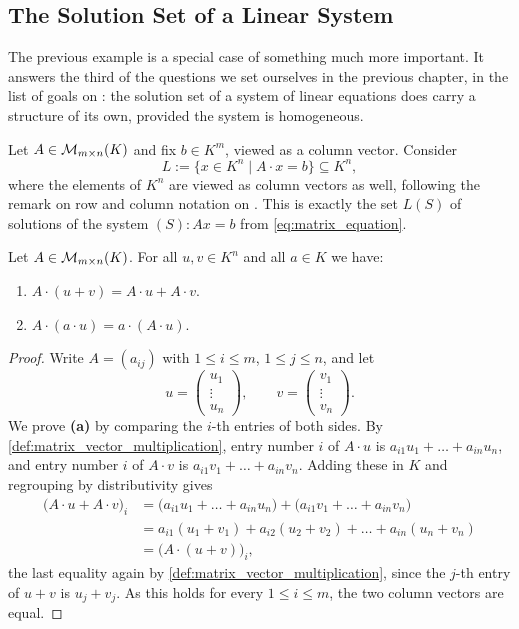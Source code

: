 \subsection{The Solution Set of a Linear System}

The previous example is a special case of something much more important. It answers the third of the questions we set ourselves in the previous chapter, in the list of goals on : the solution set of a system of linear equations does carry a structure of its own, provided the system is homogeneous.

Let $A \in \mathcal{M}_{m \times n}(K)$ and fix $b \in K^m$, viewed as a column vector. Consider
\[
L := \{x \in K^n \mid A \cdot x = b\} \subseteq K^n,
\]
where the elements of $K^n$ are viewed as column vectors as well, following the remark on row and column notation on . This is exactly the set $L(S)$ of solutions of the system $(S): Ax = b$ from \eqref{eq:matrix_equation}.

\begin{lemma}
\label{lem:matrix_vector_linearity}
Let $A \in \mathcal{M}_{m \times n}(K)$. For all $u, v \in K^n$ and all $a \in K$ we have:
\begin{enumerate}[label=\textbf{(\alph*)}]
    \item $A \cdot (u + v) = A \cdot u + A \cdot v$.
    \item $A \cdot (a \cdot u) = a \cdot (A \cdot u)$.
\end{enumerate}
\end{lemma}

\begin{proof}
Write $A = (a_{ij})$ with $1 \le i \le m$, $1 \le j \le n$, and let
\[
u = \begin{pmatrix} u_1 \\ \vdots \\ u_n \end{pmatrix}, \qquad
v = \begin{pmatrix} v_1 \\ \vdots \\ v_n \end{pmatrix}.
\]
We prove \textbf{(a)} by comparing the $i$-th entries of both sides. By \cref{def:matrix_vector_multiplication}, entry number $i$ of $A \cdot u$ is $a_{i1}u_1 + \dots + a_{in}u_n$, and entry number $i$ of $A \cdot v$ is $a_{i1}v_1 + \dots + a_{in}v_n$. Adding these in $K$ and regrouping by distributivity gives
\begin{align*}
\bigl(A \cdot u + A \cdot v\bigr)_i
&= \bigl(a_{i1}u_1 + \dots + a_{in}u_n\bigr) + \bigl(a_{i1}v_1 + \dots + a_{in}v_n\bigr) \\
&= a_{i1}(u_1 + v_1) + a_{i2}(u_2 + v_2) + \dots + a_{in}(u_n + v_n) \\
&= \bigl(A \cdot (u + v)\bigr)_i,
\end{align*}
the last equality again by \cref{def:matrix_vector_multiplication}, since the $j$-th entry of $u + v$ is $u_j + v_j$. As this holds for every $1 \le i \le m$, the two column vectors are equal.
\end{proof}

